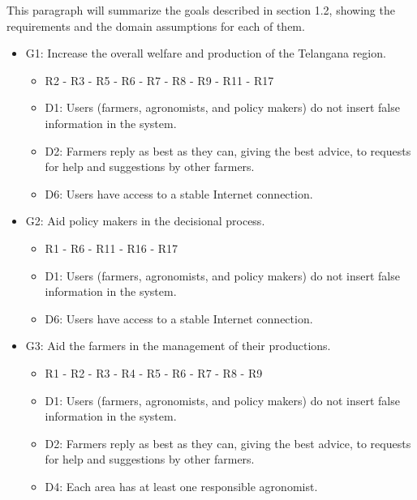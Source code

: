 \documentclass{article}
\begin{document}
\newpage

This paragraph will summarize the goals described in section 1.2, showing the requirements and the domain assumptions for each of them.

    \begin{itemize}
        \item G1: Increase the overall welfare and production of the Telangana region.
                        \begin{itemize}
                            \item R2 - R3 - R5 - R6 - R7 - R8 - R9 - R11 - R17
                            \item D1: Users (farmers, agronomists, and policy makers) do not insert false information in the system.
                            \item D2: Farmers reply as best as they can, giving the best advice, to requests for help and suggestions by other farmers.
                            \item D6: Users have access to a stable Internet connection.
                        \end{itemize}
        \item G2: Aid policy makers in the decisional process.
                        \begin{itemize}
                            \item R1 - R6 - R11 - R16 - R17
                            \item D1: Users (farmers, agronomists, and policy makers) do not insert false information in the system.
                            \item D6: Users have access to a stable Internet connection.
                        \end{itemize}                
        \item G3: Aid the farmers in the management of their productions.
                        \begin{itemize}
                            \item R1 - R2 - R3 - R4 - R5 - R6 - R7 - R8 - R9
                            \item D1: Users (farmers, agronomists, and policy makers) do not insert false information in the system.
                            \item D2: Farmers reply as best as they can, giving the best advice, to requests for help and suggestions by other farmers.
                            \item D4: Each area has at least one responsible agronomist.

\end{itemize}
\end{itemize}
\end{document}
